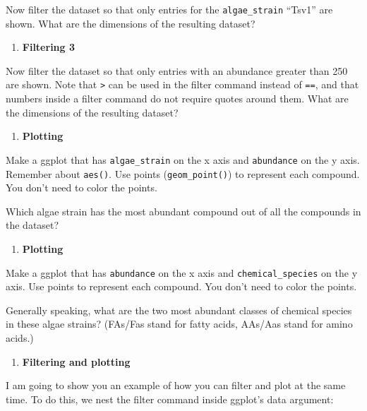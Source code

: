 \documentclass[
]{krantz}
\providecommand{\tightlist}{%
  \setlength{\itemsep}{0pt}\setlength{\parskip}{0pt}}
\begin{document}
Now filter the dataset so that only entries for the \texttt{algae\_strain} ``Tsv1'' are shown. What are the dimensions of the resulting dataset?

\begin{enumerate}
\def\labelenumi{\arabic{enumi}.}
\setcounter{enumi}{2}
\tightlist
\item
  \textbf{Filtering 3}
\end{enumerate}

Now filter the dataset so that only entries with an abundance greater than 250 are shown. Note that \texttt{\textgreater{}} can be used in the filter command instead of \texttt{==}, and that numbers inside a filter command do not require quotes around them. What are the dimensions of the resulting dataset?

\begin{enumerate}
\def\labelenumi{\arabic{enumi}.}
\setcounter{enumi}{3}
\tightlist
\item
  \textbf{Plotting}
\end{enumerate}

Make a ggplot that has \texttt{algae\_strain} on the x axis and \texttt{abundance} on the y axis. Remember about \texttt{aes()}. Use points (\texttt{geom\_point()}) to represent each compound. You don't need to color the points.

Which algae strain has the most abundant compound out of all the compounds in the dataset?

\begin{enumerate}
\def\labelenumi{\arabic{enumi}.}
\setcounter{enumi}{4}
\tightlist
\item
  \textbf{Plotting}
\end{enumerate}

Make a ggplot that has \texttt{abundance} on the x axis and \texttt{chemical\_species} on the y axis. Use points to represent each compound. You don't need to color the points.

Generally speaking, what are the two most abundant classes of chemical species in these algae strains? (FAs/Fas stand for fatty acids, AAs/Aas stand for amino acids.)

\begin{enumerate}
\def\labelenumi{\arabic{enumi}.}
\setcounter{enumi}{5}
\tightlist
\item
  \textbf{Filtering and plotting}
\end{enumerate}

I am going to show you an example of how you can filter and plot at the same time. To do this, we nest the filter command inside ggplot's data argument:
\end{document}
